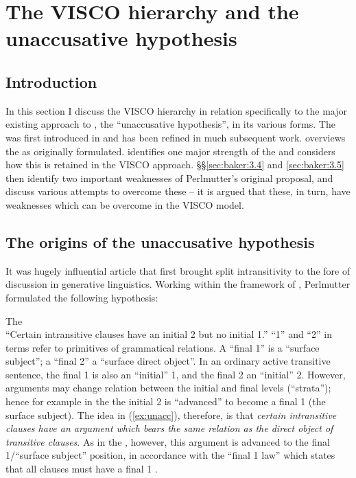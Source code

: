 \documentclass[output=paper]{langsci/langscibook}
\begin{document}
\section{The VISCO hierarchy and the unaccusative hypothesis}\label{sec:unacc}

\subsection{Introduction}\label{sec:baker:3.1}

In this section I discuss the VISCO hierarchy in relation specifically to the
major existing approach to , the \enquote{unaccusative
hypothesis}, in its various forms. The  was first
introduced in \citet{Perlmutter1978} and has been refined in much subsequent
work.  overviews the  as originally formulated. 
identifies one major strength of the  and considers how
this is retained in the VISCO approach. §§\ref{sec:baker:3.4} and \ref{sec:baker:3.5} then identify two
important weaknesses of Perlmutter’s original proposal, and discuss various
attempts to overcome these -- it is argued that these, in turn, have
weaknesses which can be overcome in the VISCO model.

\subsection{The origins of the unaccusative hypothesis}\label{sec:baker:3.2}

It was  hugely influential article that first brought
split intransitivity to the fore of discussion in generative linguistics.
Working within the framework of , Perlmutter formulated the
following hypothesis:

\ea\label{ex:unacc}The  \parencite[160]{Perlmutter1978}\\\enquote{Certain
    intransitive clauses have an initial 2 but no initial
    1.}
\z
\enquote{1} and \enquote{2} in  terms refer to primitives of
grammatical relations. A \enquote{final 1} is a \enquote{surface subject}; a
\enquote{final 2} a \enquote{surface direct object}. In an ordinary active
transitive sentence, the final 1 is also an \enquote{initial} 1, and the final
2 an \enquote{initial} 2.  However, arguments may change relation between the
initial and final levels (\enquote{strata}); hence for example in the 
the initial 2 is \enquote{advanced} to become a final 1 (the surface subject).
The idea in (\ref{ex:unacc}), therefore, is that \emph{certain intransitive
    clauses have an argument which bears the same relation as the direct object
    of transitive clauses}. As in the , however, this argument is
    advanced to the final 1\slash\enquote{surface subject} position, in accordance
    with the \enquote{final 1 law} which states that all clauses must have a
    final 1 \parencite[160]{Perlmutter1978}.
\end{document}
